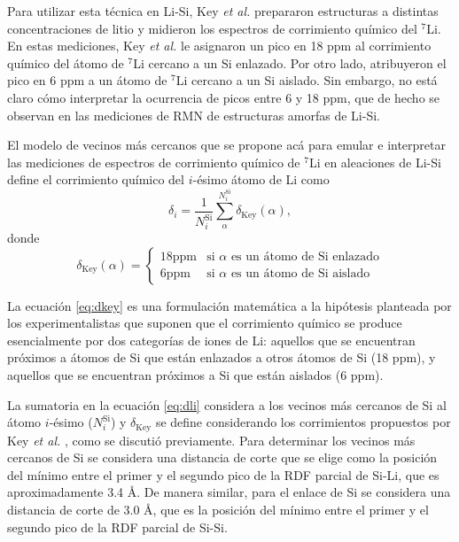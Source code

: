 Para utilizar esta 
técnica en Li-Si, Key \textit{et al.} \cite{key2009} prepararon estructuras
a distintas concentraciones de litio y midieron los espectros de corrimiento 
químico del $^7$Li. En estas mediciones, Key \textit{et al.} \cite{key2009} 
le asignaron un pico en 18 ppm al corrimiento químico del átomo de $^7$Li 
cercano a un Si enlazado. Por otro lado, atribuyeron el pico en 6 ppm a un 
átomo de $^7$Li cercano a un Si aislado. Sin embargo, no está claro cómo 
interpretar la ocurrencia de picos entre 6 y 18 ppm, que de hecho se observan 
en las mediciones de RMN de estructuras amorfas de Li-Si.

El modelo de vecinos más cercanos que se propone acá para emular e interpretar las 
mediciones de espectros de corrimiento químico de $^7$Li en aleaciones de Li-Si 
define el corrimiento químico del $i$-ésimo átomo de Li como
\begin{equation}\label{eq:dli}
    \delta_{i} = \frac{1}{N_i^{\text{Si}}} \sum^{N_i^{\text{Si}}}_{\alpha} \delta_{\text{Key}}(\alpha),
\end{equation}
donde
\begin{equation}\label{eq:dkey}
    \delta_{\text{Key}}(\alpha)=\begin{cases}
    18 \text{ppm} & \text{si } \alpha \text{ es un átomo de Si enlazado}\\
    6 \text{ppm} & \text{si } \alpha \text{ es un átomo de Si aislado} 
    \end{cases}
\end{equation}

La ecuación \ref{eq:dkey} es una formulación matemática a la hipótesis planteada
por los experimentalistas \cite{key2009} que suponen que el corrimiento químico 
se produce esencialmente por dos categorías de iones de Li: aquellos que se 
encuentran próximos a átomos de Si que están enlazados a otros átomos de Si (18 
ppm), y aquellos que se encuentran próximos a Si que están aislados (6 ppm).

La sumatoria en la ecuación \ref{eq:dli} considera a los vecinos más cercanos de 
Si al átomo $i$-ésimo ($N_i^{\text{Si}}$) y $\delta_{\text{Key}}$ se define 
considerando los corrimientos propuestos por Key \textit{et al.} \cite{key2009},
como se discutió previamente. Para determinar los vecinos más cercanos de Si 
se considera una distancia de corte que se elige como la posición del mínimo 
entre el primer y el segundo pico de la RDF parcial de Si-Li, que es 
aproximadamente 3.4 \AA. De manera similar, para el enlace de Si se considera una 
distancia de corte de 3.0 \AA, que es la posición del mínimo entre el primer y el 
segundo pico de la RDF parcial de Si-Si.

